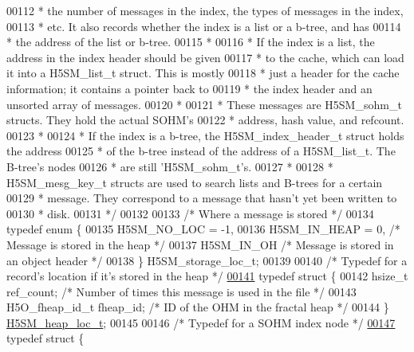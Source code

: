 \begin{DoxyCode}
00112 \textcolor{comment}{ * the number of messages in the index, the types of messages in the index,}
00113 \textcolor{comment}{ * etc.  It also records whether the index is a list or a b-tree, and has}
00114 \textcolor{comment}{ * the address of the list or b-tree.}
00115 \textcolor{comment}{ *}
00116 \textcolor{comment}{ * If the index is a list, the address in the index header should be given}
00117 \textcolor{comment}{ * to the cache, which can load it into a H5SM\_list\_t struct.  This is mostly}
00118 \textcolor{comment}{ * just a header for the cache information; it contains a pointer back to}
00119 \textcolor{comment}{ * the index header and an unsorted array of messages.}
00120 \textcolor{comment}{ *}
00121 \textcolor{comment}{ * These messages are H5SM\_sohm\_t structs.  They hold the actual SOHM's}
00122 \textcolor{comment}{ * address, hash value, and refcount.}
00123 \textcolor{comment}{ *}
00124 \textcolor{comment}{ * If the index is a b-tree, the H5SM\_index\_header\_t struct holds the address}
00125 \textcolor{comment}{ * of the b-tree instead of the address of a H5SM\_list\_t.  The B-tree's nodes}
00126 \textcolor{comment}{ * are still 'H5SM\_sohm\_t's.}
00127 \textcolor{comment}{ *}
00128 \textcolor{comment}{ * H5SM\_mesg\_key\_t structs are used to search lists and B-trees for a certain}
00129 \textcolor{comment}{ * message.  They correspond to a message that hasn't yet been written to}
00130 \textcolor{comment}{ * disk.}
00131 \textcolor{comment}{ */}
00132 
00133 \textcolor{comment}{/* Where a message is stored */}
00134 \textcolor{keyword}{typedef} \textcolor{keyword}{enum} \{
00135     H5SM\_NO\_LOC = -1,
00136     H5SM\_IN\_HEAP = 0,       \textcolor{comment}{/* Message is stored in the heap */}
00137     H5SM\_IN\_OH          \textcolor{comment}{/* Message is stored in an object header */}
00138 \} H5SM\_storage\_loc\_t;
00139 
00140 \textcolor{comment}{/* Typedef for a record's location if it's stored in the heap */}
\hyperlink{struct_h5_s_m__heap__loc__t}{00141} \textcolor{keyword}{typedef} \textcolor{keyword}{struct }\{
00142     hsize\_t ref\_count;      \textcolor{comment}{/* Number of times this message is used in the file */}
00143     H5O\_fheap\_id\_t fheap\_id;    \textcolor{comment}{/* ID of the OHM in the fractal heap */}
00144 \} \hyperlink{struct_h5_s_m__heap__loc__t}{H5SM\_heap\_loc\_t};
00145 
00146 \textcolor{comment}{/* Typedef for a SOHM index node */}
\hyperlink{struct_h5_s_m__sohm__t}{00147} \textcolor{keyword}{typedef} \textcolor{keyword}{struct }\{

\end{DoxyCode}
